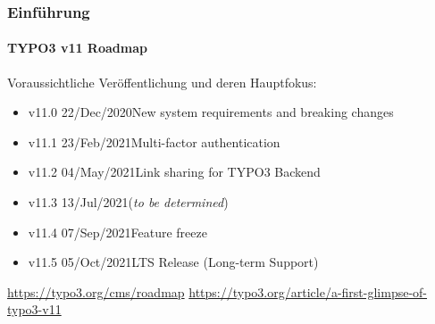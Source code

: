 %

\begin{frame}[fragile]
	\frametitle{Einführung}
	\framesubtitle{TYPO3 v11 Roadmap}

	Voraussichtliche Veröffentlichung und deren Hauptfokus:

	\begin{itemize}
		\item v11.0 \tabto{1.1cm}22/Dec/2020\tabto{3.4cm}New system requirements and breaking changes
		\item
			\begingroup
				\color{typo3orange}
				v11.1 \tabto{1.1cm}23/Feb/2021\tabto{3.4cm}Multi-factor authentication
			\endgroup
		\item v11.2 \tabto{1.1cm}04/May/2021\tabto{3.4cm}Link sharing for TYPO3 Backend
		\item v11.3 \tabto{1.1cm}13/Jul/2021\tabto{3.4cm}(\textit{to be determined})
		\item v11.4 \tabto{1.1cm}07/Sep/2021\tabto{3.4cm}Feature freeze
		\item v11.5 \tabto{1.1cm}05/Oct/2021\tabto{3.4cm}LTS Release (Long-term Support)

	\end{itemize}

	\smaller
		\url{https://typo3.org/cms/roadmap}\newline
		\url{https://typo3.org/article/a-first-glimpse-of-typo3-v11}
	\normalsize

\end{frame}

